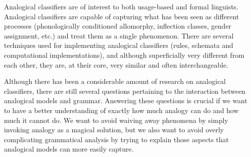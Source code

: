Analogical classifiers are of interest to both usage-based and formal linguists. Analogical classifiers are capable of capturing what has been seen as different processes (phonologically conditioned allomorphy, inflection classes, gender assignment, etc.) and treat them as a single phenomenon. There are several techniques used for implementing analogical classifiers (rules, schemata and computational implementations), and although superficially very different from each other, they are, at their core, very similar and often interchangeable.

Although there has been a considerable amount of research on analogical classifiers, there are still several questions pertaining to the interaction between analogical models and grammar. Answering these questions is crucial if we want to have a better understanding of exactly how much analogy can do and how much it cannot do. We want to avoid waiving away phenomena by simply invoking analogy as a magical solution, but we also want to avoid overly complicating grammatical analysis by trying to explain those aspects that analogical models can more easily capture.

